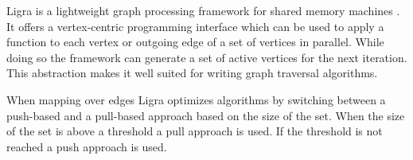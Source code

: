 

Ligra is a lightweight graph processing framework for shared memory machines \cite{Ligra}. It offers a vertex-centric programming interface which can be used to apply a function to each vertex or outgoing edge of a set of vertices in parallel. While doing so the framework can generate a set of active vertices for the next iteration. This abstraction makes it well suited for writing graph traversal algorithms.

When mapping over edges Ligra optimizes algorithms by switching between a push-based and a pull-based approach based on the size of the set. When the size of the set is above a threshold a pull approach is used. If the threshold is not reached a push approach is used.
